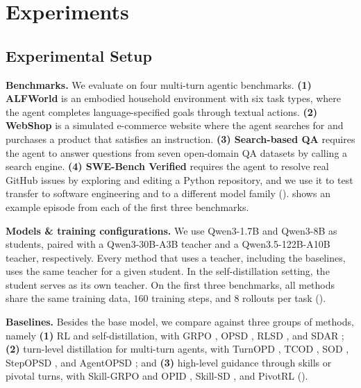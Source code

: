 \documentclass[10pt, logo, onecolumn, copyright]{nv}
\begin{document}
\section{Experiments}
\label{sec:experiments}

\subsection{Experimental Setup}
\label{sec:setup}

\textbf{Benchmarks.} We evaluate \method{} on four multi-turn agentic benchmarks. \textbf{(1) ALFWorld} \citep{shridhar2020alfworld} is an embodied household environment with six task types, where the agent completes language-specified goals through textual actions. \textbf{(2) WebShop} \citep{yao2022webshop} is a simulated e-commerce website where the agent searches for and purchases a product that satisfies an instruction. \textbf{(3) Search-based QA} \citep{jin2025searchr1} requires the agent to answer questions from seven open-domain QA datasets \citep{kwiatkowski2019nq,joshi2017triviaqa,mallen2023popqa,yang2018hotpotqa,ho20202wiki,trivedi2022musique,press2023bamboogle} by calling a search engine. \textbf{(4) SWE-Bench Verified} \citep{jimenez2023swebench} requires the agent to resolve real GitHub issues by exploring and editing a Python repository, and we use it to test transfer to software engineering and to a different model family ().  shows an example episode from each of the first three benchmarks.

\textbf{Models \& training configurations.} We use Qwen3-1.7B and Qwen3-8B \citep{yang2025qwen3} as students, paired with a Qwen3-30B-A3B teacher and a Qwen3.5-122B-A10B teacher, respectively. Every method that uses a teacher, including the baselines, uses the same teacher for a given student. In the self-distillation setting, the student serves as its own teacher. On the first three benchmarks, all methods share the same training data, $160$ training steps, and $8$ rollouts per task ().

 \textbf{Baselines.} Besides the base model, we compare \method{} against three groups of methods, namely \textbf{(1)} RL and self-distillation, with GRPO \citep{shao2024deepseekmath}, OPSD \citep{zhao2026opsd}, RLSD \citep{yang2026rlsd}, and SDAR \citep{lu2026sdar}; \textbf{(2)} turn-level distillation for multi-turn agents, with TurnOPD \citep{zhou2026turnopd}, TCOD \citep{wang2026tcod}, SOD \citep{zhong2026sod}, StepOPSD \citep{zhang2026stepopsd}, and AgentOPSD \citep{wang2026agentopsd}; and \textbf{(3)} high-level guidance through skills or pivotal turns, with Skill-GRPO and OPID \citep{yang2026opid}, Skill-SD \citep{wang2026skillsd}, and PivotRL \citep{yi2026pivotrl} ().
\end{document}

